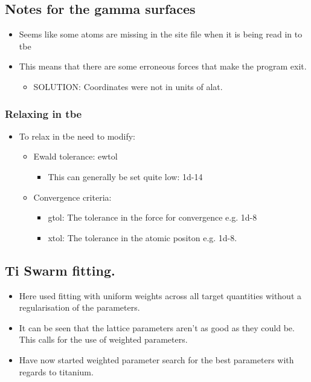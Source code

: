 \documentclass[11pt]{article}
\begin{document}
\subsection{Notes for the gamma surfaces}
\label{sec-2-2}
\begin{itemize}
\item Seems like some atoms are missing in the site file when it is being read
in to tbe
\item This means that there are some erroneous forces that make the program
exit.
\begin{itemize}
\item SOLUTION: Coordinates were not in units of alat.
\end{itemize}
\end{itemize}
\subsubsection{Relaxing in tbe}
\label{sec-2-2-1}
\begin{itemize}
\item To relax in tbe need to modify:
\begin{itemize}
\item Ewald tolerance: ewtol
\begin{itemize}
\item This can generally be set quite low: 1d-14
\end{itemize}
\item Convergence criteria:
\begin{itemize}
\item gtol: The tolerance in the force for convergence e.g. 1d-8
\item xtol: The tolerance in the atomic positon e.g. 1d-8.
\end{itemize}
\end{itemize}
\end{itemize}


\subsection{Ti Swarm fitting.}
\label{sec-2-3}
\begin{itemize}
\item Here used fitting with uniform weights across all target quantities
without a regularisation of the parameters.
\item It can be seen that the lattice parameters aren't as good as they could
be. This calls for the use of weighted parameters.
\item Have now started weighted parameter search for the best parameters with
regards to titanium.
\end{itemize}
\end{document}
